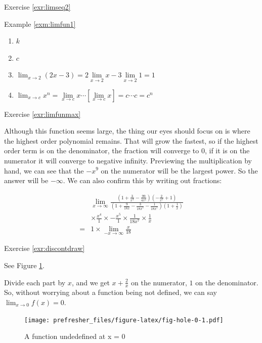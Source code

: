 \documentclass[]{book}
\providecommand{\tightlist}{%
  \setlength{\itemsep}{0pt}\setlength{\parskip}{0pt}}
\theoremstyle{definition}
\theoremstyle{definition}
\theoremstyle{definition}
\theoremstyle{remark}
\let\BeginKnitrBlock\begin \let\EndKnitrBlock\end
\begin{document}
Exercise \ref{exr:limseq2}

Example \ref{exm:limfun1}

\BeginKnitrBlock{solution}
{}

\begin{enumerate}
\def\labelenumi{\arabic{enumi}.}
\tightlist
\item
  \(k\)
\item
  \(c\)
\item
  \(\lim_{x\to 2} (2x-3) = 2\lim\limits_{x\to 2} x - 3\lim\limits_{x\to 2} 1 = 1\)
\item
  \(\lim_{x \to c} x^n = \lim\limits_{x \to c} x \cdots[\lim\limits_{x \to c} x] = c\cdots c =c^n\)
\end{enumerate}
\EndKnitrBlock{solution}

Exercise \ref{exr:limfunmax}

\BeginKnitrBlock{solution}
{}Although this function seems large, the thing our eyes should focus on is where the highest order polynomial remains. That will grow the fastest, so if the highest order term is on the denominator, the fraction will converge to 0, if it is on the numerator it will converge to negative infinity. Previewing the multiplication by hand, we can see that the \(-x^9\) on the numerator will be the largest power. So the answer will be \(-\infty\). We can also confirm this by writing out fractions:

\begin{align*}  
& \lim_{x\to\infty}\frac{\left(1 + \frac{3}{x^3} - \frac{99}{4x^4}\right)\left(-\frac{2}{x^5} + 1\right)}{\left(1 + \frac{9}{18x} - \frac{3}{18x^5} - \frac{1}{18x^7} \right)\left(1 + \frac{1}{x}\right)} \\
&\times \frac{x^4}{1} \times -\frac{x^5}{1} \times \frac{1}{18x^7}\times \frac{1}{x}\\
=& 1 \times \lim_{-x\to\infty} \frac{x}{18}
\end{align*}
\EndKnitrBlock{solution}

Exercise \ref{exr:discontdraw}

\BeginKnitrBlock{solution}
{}
See Figure \ref{fig:fig-hole-0}.

Divide each part by \(x\), and we get \(x + \frac{2}{x}\) on the numerator, \(1\) on the denominator. So, without worrying about a function being not defined, we can say \(\lim_{x\to 0}f(x) = 0\).
\EndKnitrBlock{solution}

\begin{figure}
\centering
\texttt{[image: prefresher\_files/figure-latex/fig-hole-0-1.pdf]}
\caption{\label{fig:fig-hole-0}A function undedefined at x = 0}
\end{figure}
\end{document}
